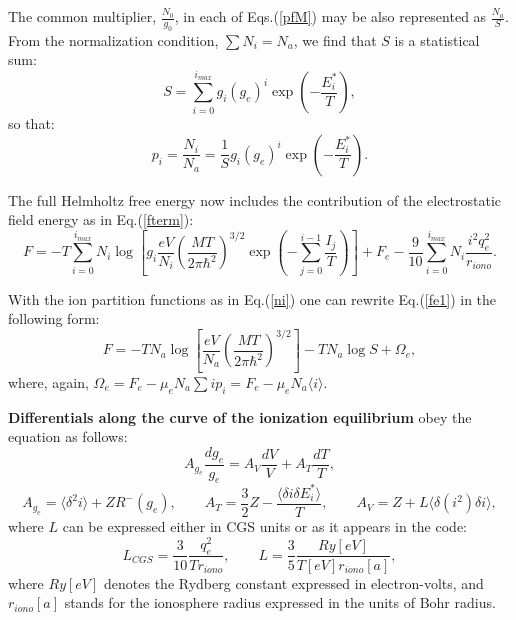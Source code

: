 The common multiplier, $\frac{N_0}{g_0}$, in each of Eqs.(\ref{pfM}) may be also represented as $\frac{N_a}{S}$.
From the normalization condition, $\sum N_i = N_a$, we find that $S$ is a statistical sum:
\begin{equation}
S=\sum_{i=0}^{i_{max}} g_i (g_e)^i \exp\left(-\frac{E_i^*}T\right),
\end{equation}
so that:
\begin{equation}\label{ni}
p_i = \frac{N_i}{N_a} = \frac{1}S g_i (g_e)^i \exp \left( -\frac{E_i^*}T \right).
\end{equation}

The full Helmholtz free energy now includes the contribution of the electrostatic field energy as in Eq.(\ref{fterm}):
\begin{equation}\label{fe1}
F=-T
\sum_{i=0}^{i_{max}}{
N_i\log\left[g_i
  \frac{eV}{N_i}\left(\frac{MT}{2\pi \hbar^2}\right)^{3/2}\exp \left(-\sum_{j=0}^{i-1}\frac{I_j}T \right)\right]}+F_e
  -\frac{9}{10} \sum_{i=0}^{i_{max}} N_i \frac{i^2 q_e^2}{r_{iono}}.
\end{equation}  

With the ion partition functions as in Eq.(\ref{ni}) one can rewrite Eq.(\ref{fe1}) in the following form:
\begin{equation}\label{ffullm}
F = -TN_a\log\left[\frac{eV}{N_a}\left(\frac{MT}{2\pi \hbar^2}\right)^{3/2}\right]-TN_a\log S + \Omega_e, 
\end{equation}
where, again, $\Omega_e = F_e - \mu_e N_a \sum i p_i = F_e - \mu_e N_a \langle i \rangle $.

{\bf Differentials along the curve of the ionization equilibrium} obey the equation as follows:
\begin{equation}\label{diffstruct}
A_{g_e} \frac{dg_e}{g_e} = A_V \frac{dV}{V} + A_T \frac{dT}{T},
\end{equation}
\begin{equation}
A_{g_e} = \langle \delta^2 i \rangle + ZR^-(g_e), \qquad
A_T     = \frac32 Z - \frac{\langle \delta i \delta E^*_i \rangle}{T}, \qquad
A_V     = Z + L \langle \delta(i^2) \delta i \rangle,
\end{equation}
where $L$ can be expressed either in CGS units or as it appears in the code:
\begin{equation}
L_{CGS}   = \frac{3}{10} \frac{q_e^2}{T r_{iono}}, \qquad
L = \frac35 \frac{Ry[eV]}{T[eV] r_{iono}[a]},
\end{equation}
where $Ry[eV]$ denotes the Rydberg constant expressed in electron-volts, and
$r_{iono}[a]$ stands for the ionosphere radius expressed in the units
of Bohr radius.

